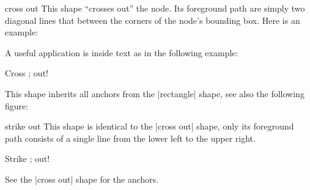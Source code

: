 \begin{shape}{cross out}
  This shape ``crosses out'' the node. Its foreground path are simply
  two diagonal lines that between the corners of the node's bounding
  box. Here is an example:

\begin{codeexample}[]
\end{codeexample}

  A useful application is inside text as in the following example:
\begin{codeexample}[]
Cross \tikz[baseline] ; out!
\end{codeexample}

  This shape inherits all anchors from the |rectangle| shape, see also
  the following figure:
\begin{codeexample}[]
\Huge
{}
\end{codeexample}
\end{shape}

\begin{shape}{strike out}
  This shape is identical to the |cross out| shape, only its foreground
  path consists of a single line from the lower left to the upper
  right.

\begin{codeexample}[]
Strike \tikz[baseline] ; out!
\end{codeexample}

  See the |cross out| shape for the anchors.
\end{shape}




